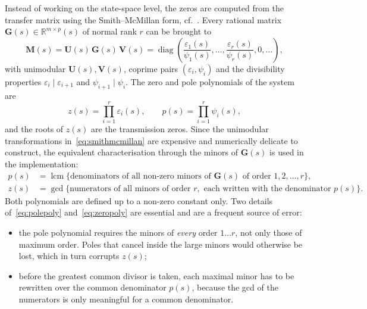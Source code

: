 Instead of working on the state-space level, the zeros are computed from the transfer matrix
using the Smith--McMillan form, cf.~\cite[Sec.~4.5]{Sko05}. Every rational matrix
$\mathbf{G}(s)\in\mathbb{R}^{m\times p}(s)$ of normal rank $r$ can be brought to
\begin{equation}
    \mathbf{M}(s) = \mathbf{U}(s)\,\mathbf{G}(s)\,\mathbf{V}(s)
    = \operatorname{diag}\!\left(
      \frac{\varepsilon_1(s)}{\psi_1(s)},\dots,\frac{\varepsilon_r(s)}{\psi_r(s)},
      0,\dots\right),
    \label{eq:smithmcmillan}
\end{equation}
with unimodular $\mathbf{U}(s),\mathbf{V}(s)$, coprime pairs
$(\varepsilon_i,\psi_i)$ and the divisibility properties
$\varepsilon_i\mid\varepsilon_{i+1}$ and $\psi_{i+1}\mid\psi_i$. The zero and pole polynomials
of the system are
\begin{equation}
    z(s) = \prod_{i=1}^{r}\varepsilon_i(s), \qquad
    p(s) = \prod_{i=1}^{r}\psi_i(s),
    \label{eq:zpolypoly}
\end{equation}
and the roots of $z(s)$ are the transmission zeros. Since the unimodular transformations
in~\eqref{eq:smithmcmillan} are expensive and numerically delicate to construct, the equivalent
characterisation through the minors of $\mathbf{G}(s)$ is used in the implementation:
\begin{align}
    p(s) &= \operatorname{lcm}\Big\{\text{denominators of all non-zero minors of }
            \mathbf{G}(s)\text{ of order } 1,2,\dots,r \Big\},
            \label{eq:polepoly}\\[4pt]
    z(s) &= \operatorname{gcd}\Big\{\text{numerators of all minors of order } r,
            \text{ each written with the denominator } p(s)\Big\}.
            \label{eq:zeropoly}
\end{align}
Both polynomials are defined up to a non-zero constant only. Two details of~\eqref{eq:polepoly}
and~\eqref{eq:zeropoly} are essential and are a frequent source of error:
\begin{itemize}
    \item the pole polynomial requires the minors of \emph{every} order $1\dots r$, not only
          those of maximum order. Poles that cancel inside the large minors would otherwise be
          lost, which in turn corrupts $z(s)$;
    \item before the greatest common divisor is taken, each maximal minor has to be rewritten
          over the common denominator $p(s)$, because the gcd of the numerators is only
          meaningful for a common denominator.
\end{itemize}

